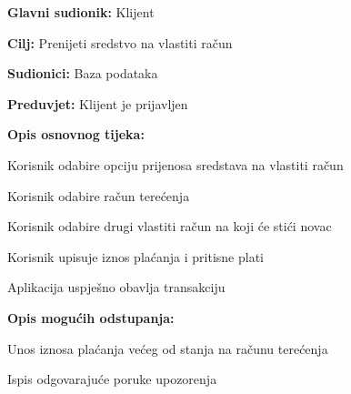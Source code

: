 			
			\noindent {}
			\begin{packed_item}
				
				\item \textbf{Glavni sudionik: }Klijent
				\item  \textbf{Cilj:} Prenijeti sredstvo na vlastiti račun
				\item  \textbf{Sudionici:} Baza podataka
				\item  \textbf{Preduvjet:} Klijent je prijavljen
				\item  \textbf{Opis osnovnog tijeka:}
				
				\item[] \begin{packed_enum}
					
					\item Korisnik odabire opciju prijenosa sredstava na vlastiti račun
					\item Korisnik odabire račun terećenja 
					\item Korisnik odabire drugi vlastiti račun na koji će stići novac
					\item Korisnik upisuje iznos plaćanja i pritisne plati
					\item Aplikacija uspješno obavlja transakciju 
					
				\end{packed_enum}
					
				
						\item  \textbf{Opis mogućih odstupanja:}
					
					\item[] \begin{packed_item}
						
						\item[4.a] Unos iznosa plaćanja većeg od stanja na računu terećenja
						\item[] \begin{packed_enum}
							
							\item Ispis odgovarajuće poruke upozorenja
							
							
						\end{packed_enum}
						
						
					\end{packed_item}
					
			
				
			\end{packed_item}
		
